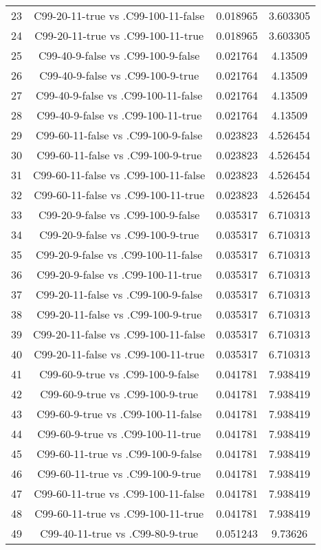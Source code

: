 \documentclass[a4paper,10pt]{article}
\begin{document}
\begin{landscape}
\begin{table}[!htp]
\begin{tabular}{cccc}
23&C99-20-11-true vs .C99-100-11-false&0.018965&3.603305\\
24&C99-20-11-true vs .C99-100-11-true&0.018965&3.603305\\
25&C99-40-9-false vs .C99-100-9-false&0.021764&4.13509\\
26&C99-40-9-false vs .C99-100-9-true&0.021764&4.13509\\
27&C99-40-9-false vs .C99-100-11-false&0.021764&4.13509\\
28&C99-40-9-false vs .C99-100-11-true&0.021764&4.13509\\
29&C99-60-11-false vs .C99-100-9-false&0.023823&4.526454\\
30&C99-60-11-false vs .C99-100-9-true&0.023823&4.526454\\
31&C99-60-11-false vs .C99-100-11-false&0.023823&4.526454\\
32&C99-60-11-false vs .C99-100-11-true&0.023823&4.526454\\
33&C99-20-9-false vs .C99-100-9-false&0.035317&6.710313\\
34&C99-20-9-false vs .C99-100-9-true&0.035317&6.710313\\
35&C99-20-9-false vs .C99-100-11-false&0.035317&6.710313\\
36&C99-20-9-false vs .C99-100-11-true&0.035317&6.710313\\
37&C99-20-11-false vs .C99-100-9-false&0.035317&6.710313\\
38&C99-20-11-false vs .C99-100-9-true&0.035317&6.710313\\
39&C99-20-11-false vs .C99-100-11-false&0.035317&6.710313\\
40&C99-20-11-false vs .C99-100-11-true&0.035317&6.710313\\
41&C99-60-9-true vs .C99-100-9-false&0.041781&7.938419\\
42&C99-60-9-true vs .C99-100-9-true&0.041781&7.938419\\
43&C99-60-9-true vs .C99-100-11-false&0.041781&7.938419\\
44&C99-60-9-true vs .C99-100-11-true&0.041781&7.938419\\
45&C99-60-11-true vs .C99-100-9-false&0.041781&7.938419\\
46&C99-60-11-true vs .C99-100-9-true&0.041781&7.938419\\
47&C99-60-11-true vs .C99-100-11-false&0.041781&7.938419\\
48&C99-60-11-true vs .C99-100-11-true&0.041781&7.938419\\
49&C99-40-11-true vs .C99-80-9-true&0.051243&9.73626\\

\end{tabular}
\end{table}
\end{landscape}
\end{document}

